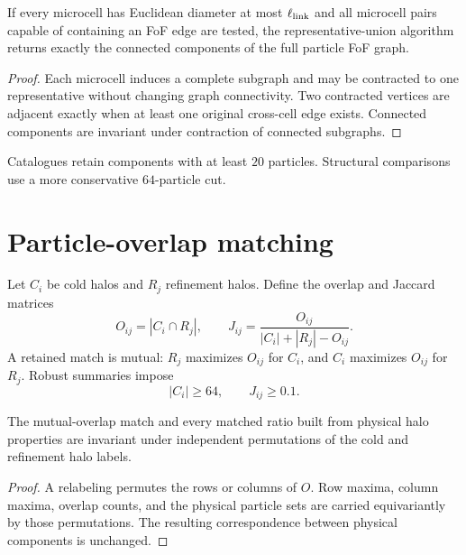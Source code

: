 \begin{theorem}
If every microcell has Euclidean diameter at most $\ell_{\rm link}$ and all microcell pairs capable of containing an FoF edge are tested, the representative-union algorithm returns exactly the connected components of the full particle FoF graph.
\label{thm:microcell-fof}
\end{theorem}

\begin{proof}
Each microcell induces a complete subgraph and may be contracted to one representative without changing graph connectivity.  Two contracted vertices are adjacent exactly when at least one original cross-cell edge exists.  Connected components are invariant under contraction of connected subgraphs.
\end{proof}

Catalogues retain components with at least $20$ particles.  Structural comparisons use a more conservative $64$-particle cut.

\section{Particle-overlap matching}

Let $C_i$ be cold halos and $R_j$ refinement halos.  Define the overlap and Jaccard matrices
\begin{equation}
 O_{ij}=|C_i\cap R_j|,
 \qquad
 J_{ij}=\frac{O_{ij}}{|C_i|+|R_j|-O_{ij}}.
\label{eq:halo-overlap}
\end{equation}
A retained match is mutual: $R_j$ maximizes $O_{ij}$ for $C_i$, and $C_i$ maximizes $O_{ij}$ for $R_j$.  Robust summaries impose
\begin{equation}
 |C_i|\geq64,
 \qquad
 J_{ij}\geq0.1.
\label{eq:robust-halo-match}
\end{equation}

\begin{theorem}
The mutual-overlap match and every matched ratio built from physical halo properties are invariant under independent permutations of the cold and refinement halo labels.
\label{thm:label-invariance}
\end{theorem}

\begin{proof}
A relabeling permutes the rows or columns of $O$.  Row maxima, column maxima, overlap counts, and the physical particle sets are carried equivariantly by those permutations.  The resulting correspondence between physical components is unchanged.
\end{proof}

